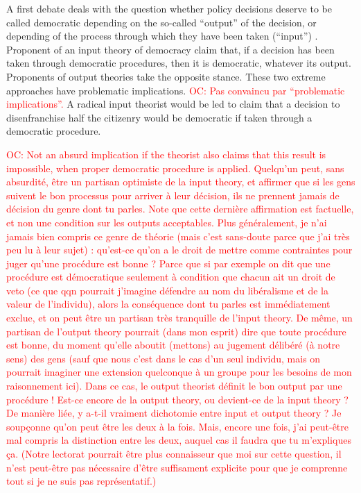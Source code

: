 \documentclass[preprint, french, english, 11pt]{elsarticle}%
\newcommand{\commentOC}[1]{\textcolor{red}{OC: #1}}
\begin{document}
A first debate deals with the question whether policy decisions deserve to be called democratic depending on the so-called “output” of the decision, or depending of the process through which they have been taken (“input”) \cite{vatn_environmental_2016, backstrand_environmental_2010}. Proponent of an input theory of democracy claim that, if a decision has been taken through democratic procedures, then it is democratic, whatever its output. Proponents of output theories take the opposite stance. These two extreme approaches have problematic implications. \commentOC{Pas convaincu par “problematic implications”.} A radical input theorist would be led to claim that a decision to disenfranchise half the citizenry would be democratic if taken through a democratic procedure. 

\commentOC{Not an absurd implication if the
theorist also claims that this result is impossible, when
proper democratic procedure is applied. Quelqu’un peut, sans absurdité, être un partisan optimiste de la input theory, et affirmer que si les gens suivent le bon processus pour arriver à leur décision, ils ne prennent jamais de décision du genre dont tu parles. Note que cette dernière affirmation est factuelle, et non une condition sur les outputs acceptables. Plus généralement, je n’ai jamais bien compris ce genre de théorie (mais c’est sans-doute parce que j’ai très peu lu à leur sujet) : qu’est-ce qu’on a le droit de mettre comme contraintes pour juger qu’une procédure est bonne ? Parce que si par exemple on dit que une procédure est démocratique seulement à condition que chacun ait un droit de veto (ce que qqn pourrait j’imagine défendre au nom du libéralisme et de la valeur de l’individu), alors la conséquence dont tu parles est immédiatement exclue, et on peut être un partisan très tranquille de l’input theory. De même, un partisan de l’output theory pourrait (dans mon esprit) dire que toute procédure est bonne, du moment qu’elle aboutit (mettons) au jugement délibéré (à notre sens) des gens (sauf que nous c’est dans le cas d’un seul individu, mais on pourrait imaginer une extension quelconque à un groupe pour les besoins de mon raisonnement ici). Dans ce cas, le output theorist définit le bon output par une procédure ! Est-ce encore de la output theory, ou devient-ce de la input theory ? De manière liée, y a-t-il vraiment dichotomie entre input et output theory ? Je soupçonne qu’on peut être les deux à la fois. Mais, encore une fois, j’ai peut-être mal compris la distinction entre les deux, auquel cas il faudra que tu m’expliques ça. (Notre lectorat pourrait être plus connaisseur que moi sur cette question, il n’est peut-être pas nécessaire d’être suffisament explicite pour que je comprenne tout si je ne suis pas représentatif.)}
\end{document}
